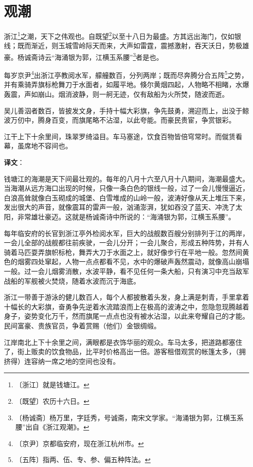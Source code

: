 \documentclass[12pt,UTF-8,openany]{ctexbook}
\begin{document}
\chapter{观潮}

\begin{normalsize}
    
    浙江\footnote{〔浙江〕就是钱塘江。}之潮，天下之伟观也。自既望\footnote{〔既望〕农历十六日。}以至十八日为最盛。方其远出海门，仅如银线；既而渐近，则玉城雪岭际天而来，大声如雷霆，震撼激射，吞天沃日，势极雄豪。杨诚斋诗云“海涌银为郭，江横玉系腰”\footnote{〔杨诚斋〕杨万里，字廷秀，号诚斋，南宋文学家。“海涌银为郭，江横玉系腰”出自《浙江观潮》。}者是也。
    
    每岁京尹\footnote{〔京尹〕京都临安府，现在浙江杭州市。}出浙江亭教阅水军，艨艟数百，分列两岸；既而尽奔腾分合五阵\footnote{〔五阵〕指两、伍、专、参、偏五种阵法。}之势，并有乘骑弄旗标枪舞刀于水面者，如履平地。倏尔黄烟四起，人物略不相睹，水爆轰震，声如崩山。烟消波静，则一舸无迹，仅有敌船为火所焚，随波而逝。
    
    吴儿善泅者数百，皆披发文身，手持十幅大彩旗，争先鼓勇，溯迎而上，出没于鲸波万仞中，腾身百变，而旗尾略不沾湿，以此夸能。而豪民贵宦，争赏银彩。
    
    江干上下十余里间，珠翠罗绮溢目。车马塞途，饮食百物皆倍穹常时。而僦赁看幕，虽席地不容间也。
\end{normalsize}


\newpage

\textbf{译文}：

\vspace{1em}

\begin{normalsize}
    
    钱塘江的海潮是天下间最壮观的。每年的八月十六至八月十八期间，海潮最盛大。当海潮从远方海口出现的时候，只像一条白色的银线一般，过了一会儿慢慢逼近，白浪高耸就像白玉砌成的城堡、白雪堆成的山岭一般，波涛好像从天上堆压下来，发出很大的声音，就像震耳的雷声一般，汹涌澎湃，犹如吞没了蓝天、冲洗了太阳，非常雄壮豪迈。这就是杨诚斋诗中所说的：“海涌银为郭，江横玉系腰”。
    
    每年临安府的长官到浙江亭外检阅水军，巨大的战舰数百艘分别排列于江的两岸，一会儿全部的战舰都往前疾驶，一会儿分开；一会儿聚合，形成五种阵势，并有人骑着马匹耍弄旗帜标枪，舞弄大刀于水面之上，就好像步行在平地一般。忽然间黄色的烟雾四处窜起，人物一点点都看不见，水中的爆破声轰然震动，就像高山崩塌一般。过一会儿烟雾消散，水波平静，看不见任何一条大船，只有演习中充当敌军战船的军舰被火焚烧，随着水波而沉于海底。
    
    浙江一带善于游泳的健儿数百人，每个人都披散着头发，身上满是刺青，手里拿着十幅长的大彩旗，奋勇争先逆着水流踏浪而上在极高的波涛之中，忽隐忽现腾越着身子，姿势变化万千，然而旗尾一点点也没有被水沾湿，以此来夸耀自己的才能。民间富豪、贵族官员，争着赏赐（他们）金银绸缎。
    
    江岸南北上下十余里之间，满眼都是衣饰华丽的观众。车马太多，把道路都塞住了，街上贩卖的饮食物品，比平时价格高出一倍。游客租借观赏的帐篷太多，（拥挤得）连容纳一席之地的空间也没有。
    
\end{normalsize}
\end{document}
